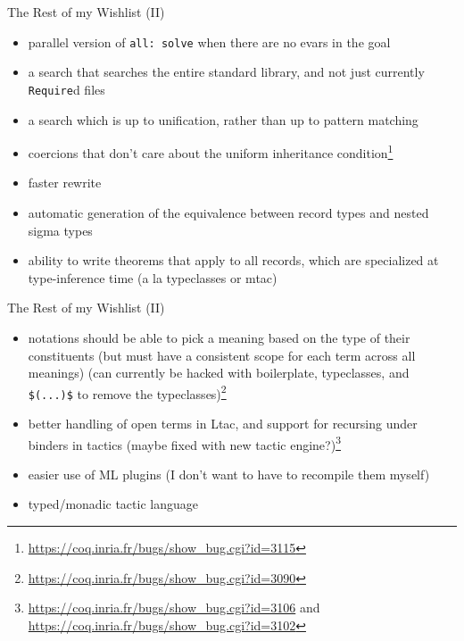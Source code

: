 \documentclass{beamer}
\begin{document}
\begin{frame}{The Rest of my Wishlist (II)}
\begin{itemize}
  \item
    parallel version of \texttt{all: solve} when there are no evars in the goal
  \item 
    a search that searches the entire standard library, and not just currently \texttt{Require}d files
  \item 
    a search which is up to unification, rather than up to pattern matching
  \item 
    coercions that don't care about the uniform inheritance condition\footnote{\url{https://coq.inria.fr/bugs/show\_bug.cgi?id=3115}}
  \item 
    faster rewrite
  \item 
    automatic generation of the equivalence between record types and nested sigma types
  \item 
    ability to write theorems that apply to all records, which are specialized at type-inference time (a la typeclasses or mtac)
\end{itemize}
\end{frame}

\begin{frame}{The Rest of my Wishlist (II)}
\begin{itemize}
  \item
    notations should be able to pick a meaning based on the type of their constituents (but must have a consistent scope for each term across all meanings) (can currently be hacked with boilerplate, typeclasses, and \texttt{\$(...)\$} to remove the typeclasses)\footnote{\url{https://coq.inria.fr/bugs/show\_bug.cgi?id=3090}}
  \item 
    better handling of open terms in Ltac, and support for recursing under binders in tactics (maybe fixed with new tactic engine?)\footnote{\url{https://coq.inria.fr/bugs/show\_bug.cgi?id=3106} and \url{https://coq.inria.fr/bugs/show\_bug.cgi?id=3102}}
  \item 
    easier use of ML plugins (I don't want to have to recompile them myself)
  \item
  	typed/monadic tactic language
\end{itemize}
\end{frame}
\end{document}
